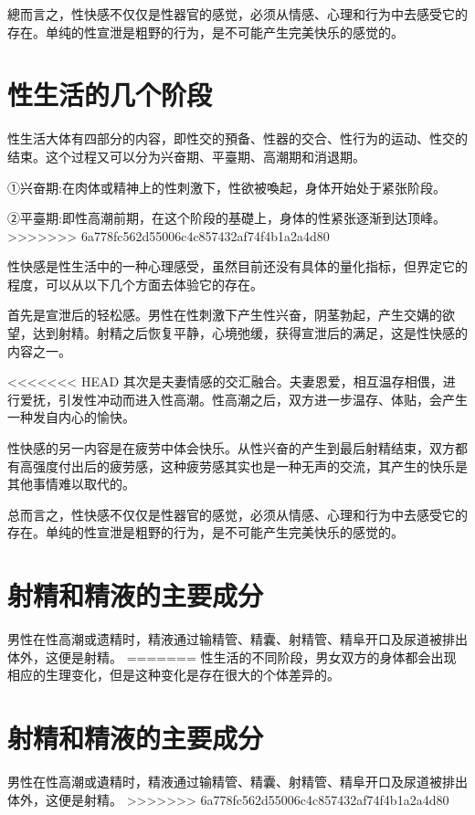 \documentclass[12pt,UTF8]{ctexbook}
\begin{document}
總而言之，性快感不仅仅是性器官的感觉，必须从情感、心理和行为中去感受它的存在。单纯的性宣泄是粗野的行为，是不可能产生完美快乐的感觉的。

\section{性生活的几个阶段}

性生活大体有四部分的内容，即性交的預备、性器的交合、性行为的运动、性交的结束。这个过程又可以分为兴奋期、平臺期、高潮期和消退期。

①兴奋期:在肉体或精神上的性刺激下，性欲被喚起，身体开始处于紧张阶段。

②平臺期:即性高潮前期，在这个阶段的基礎上，身体的性紧张逐渐到达顶峰。
>>>>>>> 6a778fc562d55006c4c857432af74f4b1a2a4d80

性快感是性生活中的一种心理感受，虽然目前还没有具体的量化指标，但界定它的程度，可以从以下几个方面去体验它的存在。

首先是宣泄后的轻松感。男性在性刺激下产生性兴奋，阴茎勃起，产生交媾的欲望，达到射精。射精之后恢复平静，心境弛缓，获得宣泄后的满足，这是性快感的内容之一。

<<<<<<< HEAD
其次是夫妻情感的交汇融合。夫妻恩爱，相互温存相偎，进行爱抚，引发性冲动而进入性高潮。性高潮之后，双方进一步温存、体贴，会产生一种发自内心的愉快。

性快感的另一内容是在疲劳中体会快乐。从性兴奋的产生到最后射精结束，双方都有高强度付出后的疲劳感，这种疲劳感其实也是一种无声的交流，其产生的快乐是其他事情难以取代的。

总而言之，性快感不仅仅是性器官的感觉，必须从情感、心理和行为中去感受它的存在。单纯的性宣泄是粗野的行为，是不可能产生完美快乐的感觉的。

\section{射精和精液的主要成分}

男性在性高潮或遗精时，精液通过输精管、精囊、射精管、精阜开口及尿道被排出体外，这便是射精。
=======
性生活的不同阶段，男女双方的身体都会出现相应的生理变化，但是这种变化是存在很大的个体差异的。

\section{射精和精液的主要成分}

男性在性高潮或遺精时，精液通过输精管、精囊、射精管、精阜开口及尿道被排出体外，这便是射精。
>>>>>>> 6a778fc562d55006c4c857432af74f4b1a2a4d80
\end{document}
